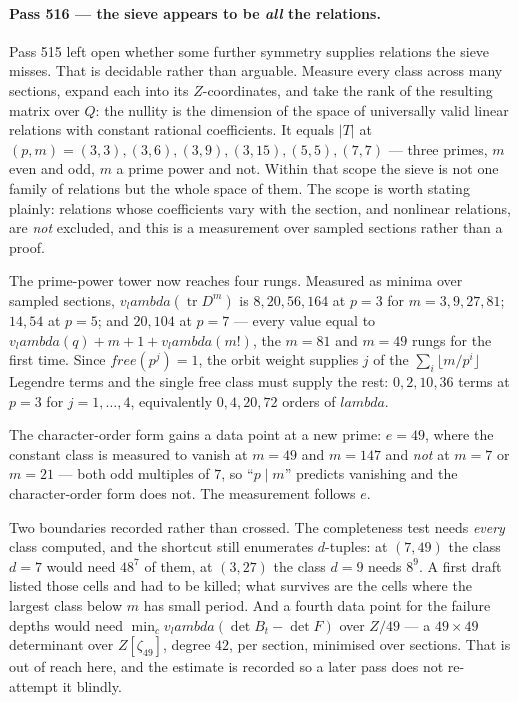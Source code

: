 \documentclass[12pt,a4paper]{article}
\def\mathbb#1{#1}%
\def\mathrm#1{#1}%
\def\mathbf#1{#1}%
\def\lambda{lambda}%
\theoremstyle{definition}
\newcommand{\ZZ}{\mathbb{Z}}
\begin{document}
\paragraph{Pass 516 --- the sieve appears to be \emph{all} the relations.}
Pass 515 left open whether some further symmetry supplies relations the sieve
misses.  That is decidable rather than arguable.  Measure every class across
many sections, expand each into its $\ZZ$-coordinates, and take the rank of the
resulting matrix over $\mathbf{Q}$: the nullity is the dimension of the space of
universally valid linear relations with constant rational coefficients.  It
equals $\lvert T\rvert$ at $(p,m)=(3,3),(3,6),(3,9),(3,15),(5,5),(7,7)$ ---
three primes, $m$ even and odd, $m$ a prime power and not.  Within that scope
the sieve is not one family of relations but the whole space of them.  The
scope is worth stating plainly: relations whose coefficients vary with the
section, and nonlinear relations, are \emph{not} excluded, and this is a
measurement over sampled sections rather than a proof.

The prime-power tower now reaches four rungs.  Measured as minima over sampled
sections, $v_\lambda(\operatorname{tr}D^m)$ is $8,20,56,164$ at $p=3$ for
$m=3,9,27,81$; $14,54$ at $p=5$; and $20,104$ at $p=7$ --- every value equal to
$v_\lambda(q)+m+1+v_\lambda(m!)$, the $m=81$ and $m=49$ rungs for the first
time.  Since $\mathrm{free}(p^j)=1$, the orbit weight supplies $j$ of the
$\sum_i\lfloor m/p^i\rfloor$ Legendre terms and the single free class must
supply the rest: $0,2,10,36$ terms at $p=3$ for $j=1,\dots,4$, equivalently
$0,4,20,72$ orders of $\lambda$.

The character-order form gains a data point at a new prime: $e=49$, where the
constant class is measured to vanish at $m=49$ and $m=147$ and \emph{not} at
$m=7$ or $m=21$ --- both odd multiples of $7$, so ``$p\mid m$'' predicts
vanishing and the character-order form does not.  The measurement follows $e$.

Two boundaries recorded rather than crossed.  The completeness test needs
\emph{every} class computed, and the shortcut still enumerates $d$-tuples: at
$(7,49)$ the class $d=7$ would need $48^{7}$ of them, at $(3,27)$ the class
$d=9$ needs $8^{9}$.  A first draft listed those cells and had to be killed;
what survives are the cells where the largest class below $m$ has small period.
And a fourth data point for the failure depths would need
$\min_c v_\lambda(\det B_t-\det F)$ over $\ZZ/49$ --- a $49\times49$ determinant
over $\ZZ[\zeta_{49}]$, degree $42$, per section, minimised over sections.  That
is out of reach here, and the estimate is recorded so a later pass does not
re-attempt it blindly.
\end{document}
